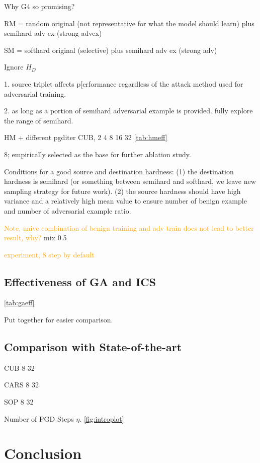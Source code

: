 \documentclass[10pt,twocolumn,letterpaper]{article}
\newcommand{\oo}[1]{\textcolor{orange}{#1}}
\begin{document}
Why G4 so promising?

RM = random original (not representative for what the model should learn) plus semihard adv ex (strong advex)

SM = softhard original (selective) plus semihard adv ex (strong adv)

Ignore $H_D$

1. source triplet affects p[erformance regardless of the attack method used for adversarial training.

2. as long as a portion of semihard adversarial example is provided. fully explore the range of semihard.


HM + different pgditer
CUB, 2 4 8 16 32
\cref{tab:hmeff}

8; empirically selected as the base for further ablation study.

Conditions for a good source and destination hardness:
%
(1) the destination hardness is semihard (or something between semihard
and softhard, we leave new sampling strategy for future work).
(2) the source hardness should have high variance and a relatively high mean
value to ensure number of benign example and number of adversarial example ratio.

\oo{Note, naive combination of benign training and adv train does not lead to better
result, why?} mix 0.5

\oo{experiment, 8 step by default}

\subsection{Effectiveness of GA and ICS}
\label{sec:43}



\cref{tab:gaeff}



Put together for easier comparison.

\subsection{Comparison with State-of-the-art}



CUB 8 32

CARS 8 32

SOP 8 32

Number of PGD Steps $\eta$.
\cref{fig:introplot}

\section{Conclusion}
\label{sec:5}
\end{document}
